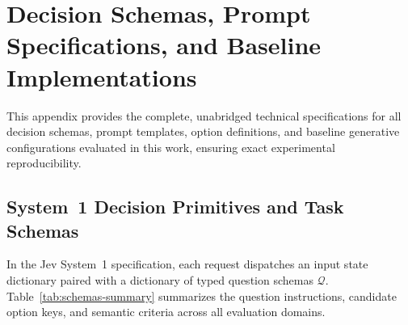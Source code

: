 \documentclass[10pt]{article}
\begin{document}
\begin{table}[!htbp]
\centering
\caption{Subword-level faithfulness (Qwen3.5 tokenizer).}
\label{tab:faith-subword}
\resizebox{\textwidth}{!}{}
\end{table}

\clearpage
\section{Decision Schemas, Prompt Specifications, and Baseline Implementations}
\label{sec:prompts}

This appendix provides the complete, unabridged technical specifications for all decision schemas, prompt templates, option definitions, and baseline generative configurations evaluated in this work, ensuring exact experimental reproducibility.

\subsection{System~1 Decision Primitives and Task Schemas}
\label{sec:system1-schemas}
In the Jev System~1 specification, each request dispatches an input state dictionary paired with a dictionary of typed question schemas $\mathcal{Q}$.
Table~\ref{tab:schemas-summary} summarizes the question instructions, candidate option keys, and semantic criteria across all evaluation domains.
\end{document}
